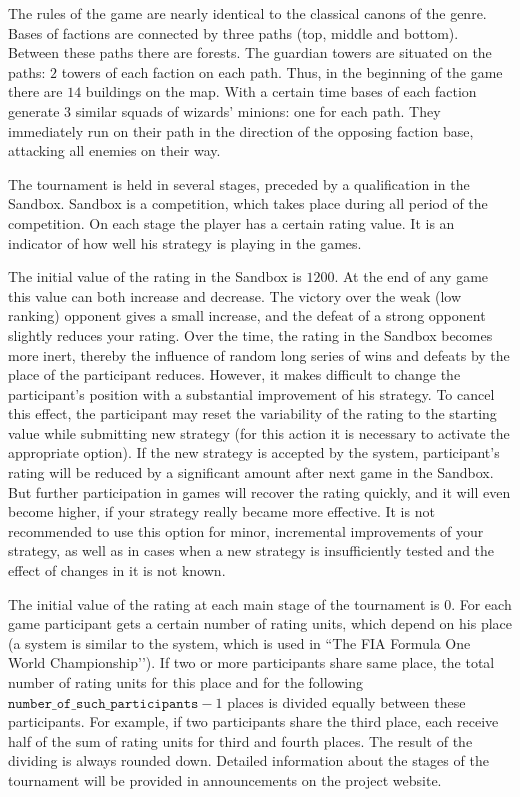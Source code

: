 The rules of the game are nearly identical to the classical canons of the genre. Bases of factions are connected by three paths (top,
middle and bottom). Between these paths there are forests. The guardian towers are situated on the paths: $2$ towers of each faction
on each path. 
Thus, in the beginning of the game there are $14$ buildings on the map. With a certain time bases of each faction generate
$3$ similar squads of wizards’ minions: one for each path. They immediately run on their path in
the direction of the opposing faction base, attacking all enemies on their way.

The tournament is held in several stages, preceded by a qualification in the Sandbox.
Sandbox is a competition, which takes place during all period of the competition.
On each stage the player has a certain rating value.
It is an indicator of how well his strategy is playing in the games.

The initial value of the rating in the Sandbox is $1200$. At the end of any game this value can both increase and decrease. The victory
over the weak (low ranking) opponent gives a small increase, and the defeat of a strong opponent slightly reduces your
rating. Over the time, the rating in the Sandbox becomes more inert, thereby the influence of random long series of wins and
defeats by the place of the participant reduces.
However, it makes difficult to change the participant’s position with a substantial improvement of his strategy. To cancel
this effect, the participant may reset the variability of the rating to the starting value while submitting new strategy
(for this action it is necessary to activate the appropriate option).
If the new strategy is accepted by the system, participant's rating will be reduced by a significant amount after next game in the Sandbox. But
further participation in games will recover the rating quickly, and it will even become higher, if your strategy really became more effective.
It is not recommended to use this option for minor, incremental improvements of your strategy, as well as in cases when a new strategy is
insufficiently tested and the effect of changes in it is not known.

The initial value of the rating at each main stage of the tournament is $0$.
For each game participant gets a certain number of rating units, which depend on his place
(a system is similar to the system, which is  used in ``The FIA Formula One World Championship’’).
If two or more participants share same place, the total number of rating units for this place and for the following
$\texttt{number\_of\_such\_participants}-1$ places is divided
equally between these participants. For example, if two participants share the third place,
each receive half of the sum of rating units for third and fourth places. The result of the dividing is always rounded down.
Detailed information about the stages of the tournament will be provided in announcements on the project website.

